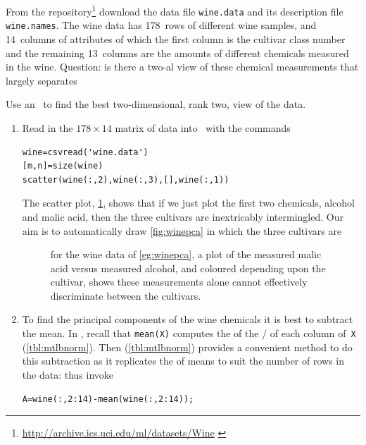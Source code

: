\begin{example} \label{eg:winepca}
From the \cite{Dua2019} repository\footnote{\url{http://archive.ics.uci.edu/ml/datasets/Wine} \cite[]{Dua2019}} download the data file \verb|wine.data| and its description file \verb|wine.names|.
The wine data has 178~rows of different wine samples, and 14~columns of attributes of which the first column is the cultivar class number and the remaining 13~columns are the amounts of different chemicals measured in the wine.
Question: is there a two-al view of these chemical measurements that largely separates 

\begin{solution} 
Use an \svd\ to find the best two-dimensional, rank two, view of the data.
\begin{enumerate}
\item Read in the \(178\times14\) matrix of data into \script\ with the commands
\begin{verbatim}
wine=csvread('wine.data')
[m,n]=size(wine)
scatter(wine(:,2),wine(:,3),[],wine(:,1))
\end{verbatim}
\setbox\ajrqrbox\hbox{}%
\marginajrbox%
The scatter plot, \cref{fig:wine12}, shows that if we just plot the first two chemicals, alcohol and malic acid, then the three cultivars are inextricably intermingled.
Our aim is to automatically draw \cref{fig:winepca} in which the three cultivars are 
\begin{figure}
\centering

\caption{for the wine data of \cref{eg:winepca}, a plot of the measured malic acid versus measured alcohol, and coloured depending upon the cultivar, shows these measurements alone cannot effectively discriminate between the cultivars.}
\label{fig:wine12}
\end{figure}


\item To find the principal components of the wine chemicals it is best to subtract the mean.
In \script, recall that \verb|mean(X)| computes the  of the \slash {} of each column of~\verb|X| (\cref{tbl:mtlbnorm}).
Then  (\cref{tbl:mtlbnorm}) provides a convenient method to do this subtraction as it replicates the  of means to suit the number of rows in the data: thus invoke
\begin{verbatim}
A=wine(:,2:14)-mean(wine(:,2:14));
\end{verbatim}


\end{enumerate}
\end{solution}
\end{example}
